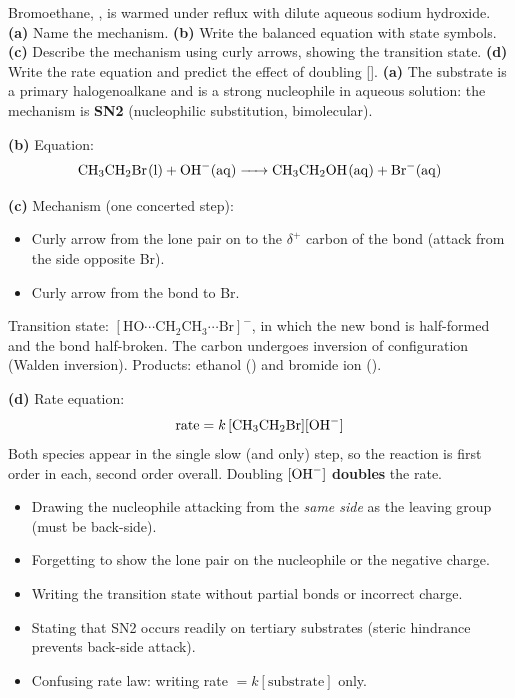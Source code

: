 \documentclass[11pt]{article}
\newcommand{\cle}[1]{{\popxbold\color{popdark}#1}}
\begin{document}
\begin{exoresolu}
Bromoethane, , is warmed under reflux with dilute aqueous sodium hydroxide.
\textbf{(a)} Name the mechanism. \textbf{(b)} Write the balanced equation with state symbols. \textbf{(c)} Describe the mechanism using curly arrows, showing the transition state. \textbf{(d)} Write the rate equation and predict the effect of doubling [].
\tcblower
\textbf{(a)} The substrate is a \cle{primary} halogenoalkane and  is a strong nucleophile in aqueous solution: the mechanism is \textbf{SN2} (nucleophilic substitution, bimolecular).

\textbf{(b)} Equation:
\[ \ce{CH3CH2Br(l) + OH-(aq) -> CH3CH2OH(aq) + Br-(aq)} \]

\textbf{(c)} Mechanism (one concerted step):
\begin{itemize}
\item Curly arrow from the lone pair on  to the $\delta^+$ carbon of the  bond (attack from the side opposite Br).
\item Curly arrow from the  bond to Br.
\end{itemize}
Transition state: $[\mathrm{HO}\cdots\mathrm{CH_2CH_3}\cdots\mathrm{Br}]^-$, in which the new  bond is half-formed and the  bond half-broken. The carbon undergoes inversion of configuration (Walden inversion). Products: ethanol () and bromide ion ().

\textbf{(d)} Rate equation:
\[ \text{rate} = k\,[\ce{CH3CH2Br}][\ce{OH-}] \]
Both species appear in the single slow (and only) step, so the reaction is first order in each, second order overall. Doubling $[\ce{OH-}]$ \textbf{doubles} the rate.
\end{exoresolu}

\begin{attention}
\begin{itemize}
\item Drawing the nucleophile attacking from the \emph{same side} as the leaving group (must be back-side).
\item Forgetting to show the lone pair on the nucleophile or the negative charge.
\item Writing the transition state without partial bonds or incorrect charge.
\item Stating that SN2 occurs readily on tertiary substrates (steric hindrance prevents back-side attack).
\item Confusing rate law: writing rate $= k[\text{substrate}]$ only.
\end{itemize}
\end{attention}
\end{document}
